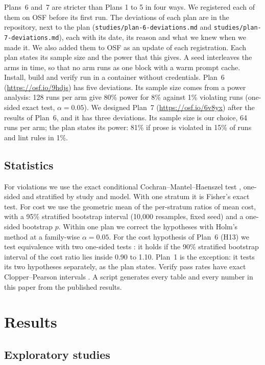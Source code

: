 \documentclass[pdflatex,sn-basic]{sn-jnl}
\newcommand{\file}[1]{\texttt{#1}}
\begin{document}
Plans~6 and~7 are stricter than Plans 1 to 5 in four ways.
We registered each of them on OSF before its first run.
The deviations of each plan are in the repository, next to the plan (\file{studies/plan-6-deviations.md} and \file{studies/plan-7-deviations.md}), each with its date, its reason and what we knew when we made it.
We also added them to OSF as an update of each registration.
Each plan states its sample size and the power that this gives.
A seed interleaves the arms in time, so that no arm runs as one block with a warm prompt cache.
Install, build and verify run in a container without credentials.
Plan~6 (\url{https://osf.io/9hdjs}) has five deviations.
Its sample size comes from a power analysis: 128 runs per arm give 80\% power for 8\% against 1\% violating runs (one-sided exact test, $\alpha=0.05$).
We designed Plan~7 (\url{https://osf.io/6v8yx}) after the results of Plan~6, and it has three deviations.
Its sample size is our choice, 64 runs per arm; the plan states its power: 81\% if prose is violated in 15\% of runs and lint rules in 1\%.

\subsection{Statistics}

For violations we use the exact conditional Cochran--Mantel--Haenszel test \citep{mantel1959}, one-sided and stratified by study and model.
With one stratum it is Fisher's exact test.
For cost we use the geometric mean of the per-stratum ratios of mean cost, with a 95\% stratified bootstrap interval (10{,}000 resamples, fixed seed) \citep{efron1993bootstrap} and a one-sided bootstrap $p$.
Within one plan we correct the hypotheses with Holm's method \citep{holm1979} at a family-wise $\alpha=0.05$.
For the cost hypothesis of Plan~6 (H13) we test equivalence with two one-sided tests \citep{schuirmann1987tost,lakens2017equivalence}: it holds if the 90\% stratified bootstrap interval of the cost ratio lies inside 0.90 to 1.10.
Plan~1 is the exception: it tests its two hypotheses separately, as the plan states.
Verify pass rates have exact Clopper--Pearson intervals \citep{clopper1934}.
A script generates every table and every number in this paper from the published results.

\section{Results}
\label{sec:results}

\subsection{Exploratory studies}
\end{document}
